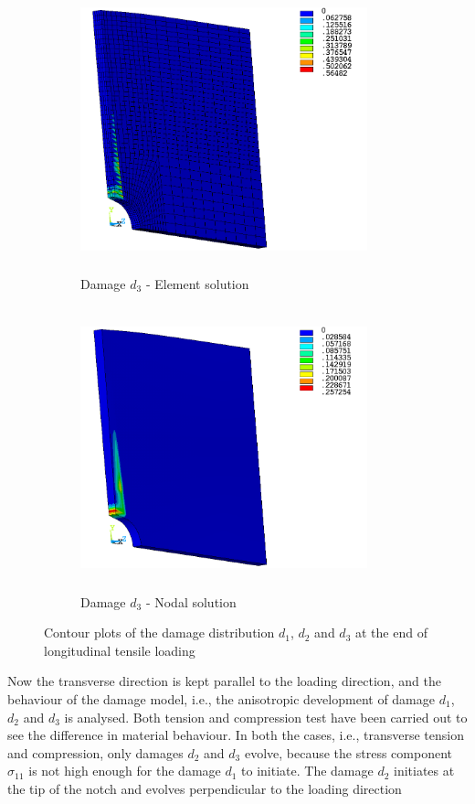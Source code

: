 \documentclass[12pt,twoside]{report}
\begin{document}
\begin{figure}[htbp!]\ContinuedFloat     
     \begin{subfigure}[b]{0.4\textwidth}
         \includegraphics[width=8.3cm,height=8.2cm,keepaspectratio]{27.d3-lt-e.png}
         \caption{Damage $d_{3}$ - Element solution}
         \label{fig:d3-lt-e}
     \end{subfigure}
     \hspace{1.8cm}
     \begin{subfigure}[b]{0.4\textwidth}
         \includegraphics[width=8.3cm,height=8.2cm,keepaspectratio]{27.d3-lt-n.png}
         \caption{Damage $d_{3}$ - Nodal solution}
         \label{fig:d3-lt-n}
     \end{subfigure}
        \caption{Contour plots of the damage distribution $d_{1}$, $d_{2}$ and $d_{3}$ at the end of longitudinal tensile loading }
        \label{fig:Contour plots of the damage d1,d2,d3}     
\end{figure}
\FloatBarrier
\indent\indent\indent Now the transverse direction is kept parallel to the loading direction, and the behaviour of the damage model, i.e., the anisotropic development of damage  $d_{1}$, $d_{2}$ and $d_{3}$ is analysed. Both tension and compression test have been carried out to see the difference in material behaviour. In both the cases, i.e., transverse tension and compression, only damages $d_{2}$ and $d_{3}$ evolve, because the stress component $\sigma_{11}$ is not high enough for the damage $d_{1}$ to initiate. The damage $d_{2}$ initiates at the tip of the notch and evolves perpendicular to the loading direction 
\end{document}
